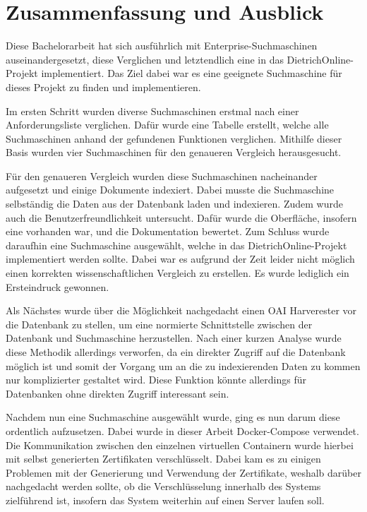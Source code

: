 \chapter{Zusammenfassung und Ausblick}

Diese Bachelorarbeit hat sich ausführlich mit Enterprise-Suchmaschinen auseinandergesetzt, diese Verglichen und letztendlich eine in das DietrichOnline-Projekt implementiert. Das Ziel dabei war es eine geeignete Suchmaschine für dieses Projekt zu finden und implementieren.  

Im ersten Schritt wurden diverse Suchmaschinen erstmal nach einer Anforderungsliste verglichen. Dafür wurde eine Tabelle erstellt, welche alle Suchmaschinen anhand der gefundenen Funktionen verglichen. Mithilfe dieser Basis wurden vier Suchmaschinen für den genaueren Vergleich herausgesucht.

Für den genaueren Vergleich wurden diese Suchmaschinen nacheinander aufgesetzt und einige Dokumente indexiert. Dabei musste die Suchmaschine selbständig die Daten aus der Datenbank laden und indexieren. Zudem wurde auch die Benutzerfreundlichkeit untersucht. Dafür wurde die Oberfläche, insofern eine vorhanden war, und die Dokumentation bewertet. Zum Schluss wurde daraufhin eine Suchmaschine ausgewählt, welche in das DietrichOnline-Projekt implementiert werden sollte. Dabei war es aufgrund der Zeit leider nicht möglich einen korrekten wissenschaftlichen Vergleich zu erstellen. Es wurde lediglich ein Ersteindruck gewonnen.

Als Nächstes wurde über die Möglichkeit nachgedacht einen OAI Harverester vor die Datenbank zu stellen, um eine normierte Schnittstelle zwischen der Datenbank und Suchmaschine herzustellen. Nach einer kurzen Analyse wurde diese Methodik allerdings verworfen, da ein direkter Zugriff auf die Datenbank möglich ist und somit der Vorgang um an die zu indexierenden Daten zu kommen nur komplizierter gestaltet wird. Diese Funktion könnte allerdings für Datenbanken ohne direkten Zugriff interessant sein. 

Nachdem nun eine Suchmaschine ausgewählt wurde, ging es nun darum diese ordentlich aufzusetzen. Dabei wurde in dieser Arbeit Docker-Compose verwendet. Die Kommunikation zwischen den einzelnen virtuellen Containern wurde hierbei mit selbst generierten Zertifikaten verschlüsselt. Dabei kam es zu einigen Problemen mit der Generierung und Verwendung der Zertifikate, weshalb darüber nachgedacht werden sollte, ob die Verschlüsselung innerhalb des Systems zielführend ist, insofern das System weiterhin auf einen Server laufen soll. 

